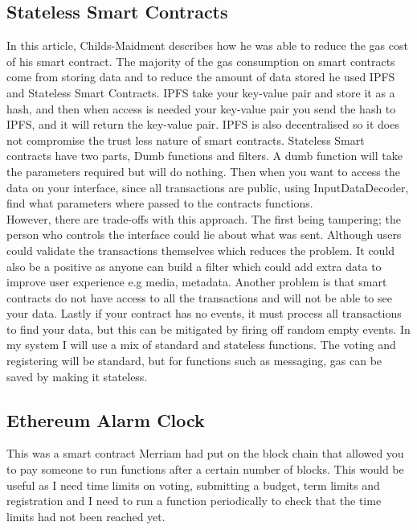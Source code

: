 \subsection*{Stateless Smart Contracts \cite{Childs-Maidment:2016:pdflatex}}
In this article, Childs-Maidment describes how he was able to reduce the gas cost of his smart contract. The majority of the gas consumption on smart contracts come from storing data and to reduce the amount of data stored he used IPFS and Stateless Smart Contracts. IPFS take your key-value pair and store it as a hash, and then when access is needed your key-value pair you send the hash to IPFS, and it will return the key-value pair. IPFS is also decentralised so it does not compromise the trust less nature of smart contracts. Stateless Smart contracts have two parts, Dumb functions and filters. A dumb function will take the parameters required but will do nothing. Then when you want to access the data on your interface, since all transactions are public, using InputDataDecoder, find what parameters where passed to the contracts functions.  \\
However, there are trade-offs with this approach. The first being tampering; the person who controls the interface could lie about what was sent.  Although users could validate the transactions themselves which reduces the problem. It could also be a positive as anyone can build a filter which could add extra data to improve user experience e.g media, metadata. Another problem is that smart contracts do not have access to all the transactions and will not be able to see your data. Lastly if your contract has no events, it must process all transactions to find your data, but this can be mitigated by firing off random empty events. In my system I will use a mix of standard and stateless functions. The voting and registering will be standard, but for functions such as messaging, gas can be saved by making it stateless.
\subsection*{Ethereum Alarm Clock  \cite{Merriam:2017:pdflatex}}
This was a smart contract Merriam had put on the block chain that allowed you to pay someone to run functions after a certain number of blocks. This would be useful as I need time limits on voting, submitting a budget, term limits and registration and I need to run a function periodically to check that the time limits had not been reached yet.

